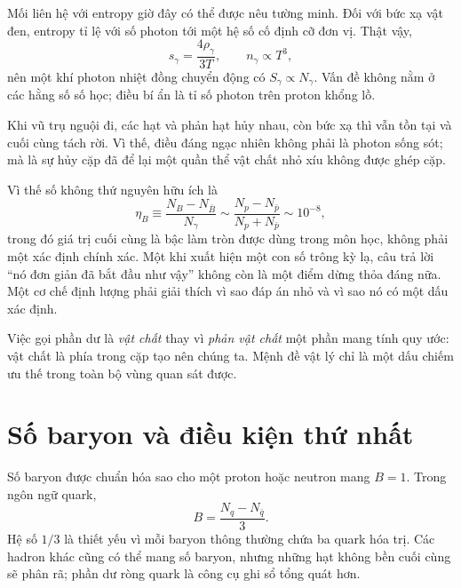 Mối liên hệ với entropy giờ đây có thể được nêu tường minh. Đối với bức xạ vật đen, entropy tỉ lệ với số photon tới một hệ số cố định cỡ đơn vị. Thật vậy,
\begin{equation}
s_\gamma=\frac{4\rho_\gamma}{3T},
\qquad
n_\gamma\propto T^3,
\end{equation}
nên một khí photon nhiệt đồng chuyển động có \(S_\gamma\propto N_\gamma\). Vấn đề không nằm ở các hằng số số học; điều bí ẩn là tỉ số photon trên proton khổng lồ.

\begin{classroomqa}
\end{classroomqa}

Khi vũ trụ nguội đi, các hạt và phản hạt hủy nhau, còn bức xạ thì vẫn tồn tại và cuối cùng tách rời. Vì thế, điều đáng ngạc nhiên không phải là photon sống sót; mà là sự hủy cặp đã để lại một quần thể vật chất nhỏ xíu không được ghép cặp.

Vì thế số không thứ nguyên hữu ích là
\begin{equation}
\eta_B
\equiv
\frac{N_B-N_{\bar B}}{N_\gamma}
\sim
\frac{N_p-N_{\bar p}}{N_p+N_{\bar p}}
\sim 10^{-8},
\label{eq:c08-baryon-asymmetry}
\end{equation}
trong đó giá trị cuối cùng là bậc làm tròn được dùng trong môn học, không phải một xác định chính xác. Một khi xuất hiện một con số trông kỳ lạ, câu trả lời ``nó đơn giản đã bắt đầu như vậy'' không còn là một điểm dừng thỏa đáng nữa. Một cơ chế định lượng phải giải thích vì sao đáp án nhỏ và vì sao nó có một dấu xác định.

Việc gọi phần dư là \emph{vật chất} thay vì \emph{phản vật chất} một phần mang tính quy ước: vật chất là phía trong cặp tạo nên chúng ta. Mệnh đề vật lý chỉ là một dấu chiếm ưu thế trong toàn bộ vùng quan sát được.

\section{Số baryon và điều kiện thứ nhất}

Số baryon được chuẩn hóa sao cho một proton hoặc neutron mang \(B=1\). Trong ngôn ngữ quark,
\begin{equation}
B=\frac{N_q-N_{\bar q}}{3}.
\label{eq:c08-baryon-number}
\end{equation}
Hệ số \(1/3\) là thiết yếu vì mỗi baryon thông thường chứa ba quark hóa trị. Các hadron khác cũng có thể mang số baryon, nhưng những hạt không bền cuối cùng sẽ phân rã; phần dư ròng quark là công cụ ghi sổ tổng quát hơn.


